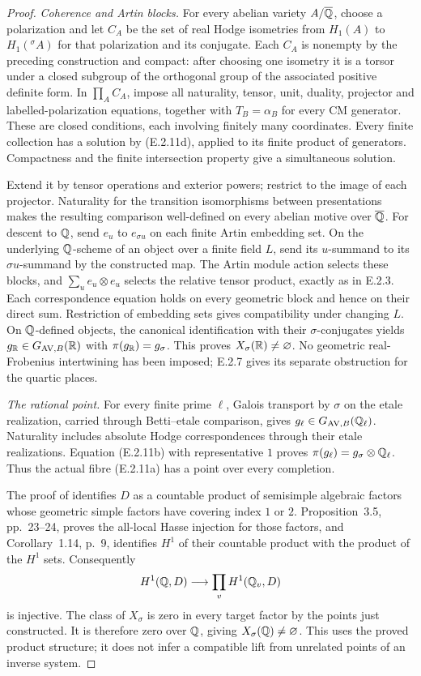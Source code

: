 \begin{proof}
\emph{Coherence and Artin blocks.}
For every abelian variety $A/\overline{\mathbb Q}$, choose a polarization and let
$C_A$ be the set of real Hodge isometries from $H_1(A)$ to
$H_1({}^\sigma A)$ for that polarization and its conjugate.
Each $C_A$ is nonempty by the preceding construction and compact:
after choosing one isometry it is a torsor under a closed subgroup
of the orthogonal group of the associated positive definite form.
In $\prod_A C_A$, impose all naturality, tensor, unit, duality,
projector and labelled-polarization equations, together with
$T_B=\alpha_B$ for every CM generator. These are closed conditions,
each involving finitely many coordinates. Every finite collection
has a solution by (E.2.11d), applied to its finite product of
generators. Compactness and the finite intersection property give
a simultaneous solution.

Extend it by tensor operations and exterior powers; restrict to
the image of each projector. Naturality for the transition
isomorphisms between presentations makes the resulting comparison
well-defined on every abelian motive over $\overline{\mathbb Q}$.
For descent to $\mathbb Q$, send $e_u$ to $e_{\sigma u}$ on each finite
Artin embedding set. On the underlying $\mathbb Q$-scheme of an object
over a finite field $L$, send its $u$-summand to its $\sigma u$-summand
by the constructed map. The Artin module action selects these
blocks, and $\sum_u e_u\otimes e_u$ selects the relative tensor
product, exactly as in E.2.3. Each correspondence equation holds
on every geometric block and hence on their direct sum. Restriction
of embedding sets gives compatibility under changing $L$.
On $\mathbb Q$-defined objects, the canonical identification with their
$\sigma$-conjugates yields
$g_{\mathbb R}\in G_{\mathrm{AV},B}(\mathbb R)$ with
$\pi(g_{\mathbb R})=g_\sigma$. This proves $X_\sigma(\mathbb R)\ne\varnothing$.
No geometric real-Frobenius intertwining has been imposed;
E.2.7 gives its separate obstruction for the quartic places.

\emph{The rational point.}
For every finite prime $\ell$, Galois transport by $\sigma$ on
the etale realization, carried through Betti--etale comparison,
gives $g_\ell\in G_{\mathrm{AV},B}(\mathbb Q_\ell)$.
Naturality includes absolute Hodge correspondences through their
etale realizations. Equation (E.2.11b) with representative $1$
proves $\pi(g_\ell)=g_\sigma\otimes\mathbb Q_\ell$.
Thus the actual fibre (E.2.11a) has a point over every completion.

The proof of \cite[Proposition~3.12 and Theorem~3.13,
p.~26 of the author version]{GenMilnePeriods2004}
identifies $D$ as a countable product of semisimple algebraic
factors whose geometric simple factors have covering index $1$
or $2$. Proposition~3.5, pp.~23--24, proves the all-local Hasse
injection for those factors, and Corollary~1.14, p.~9, identifies
$H^1$ of their countable product with the product of the $H^1$
sets. Consequently
\[
 H^1(\mathbb Q,D)\longrightarrow\prod_v H^1(\mathbb Q_v,D)
\]
is injective. The class of $X_\sigma$ is zero in every target
factor by the points just constructed. It is therefore zero
over $\mathbb Q$, giving $X_\sigma(\mathbb Q)\ne\varnothing$.
This uses the proved product structure; it does not infer a
compatible lift from unrelated points of an inverse system.


\end{proof}
